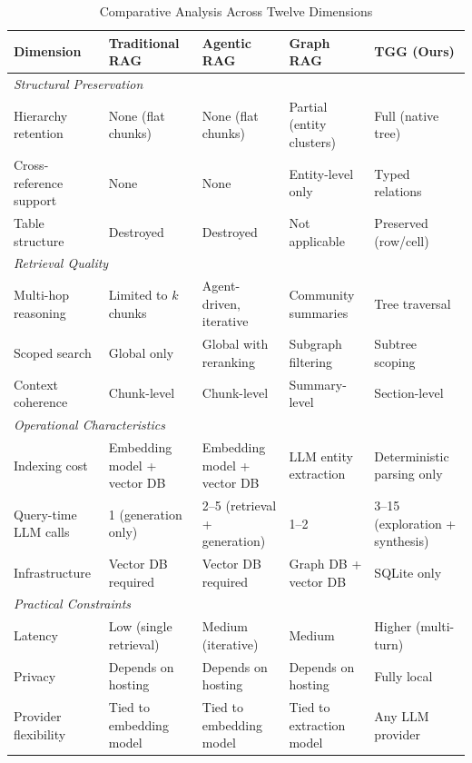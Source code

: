 \documentclass[conference]{IEEEtran}
\begin{document}
\begin{table}[t]
\centering
\caption{Comparative Analysis Across Twelve Dimensions}
\label{tab:comparison}
\footnotesize
\begin{tabular}{@{}p{2.8cm}p{3.2cm}p{3.2cm}p{3.2cm}p{3.2cm}@{}}
\toprule
\textbf{Dimension} & \textbf{Traditional RAG} & \textbf{Agentic RAG} & \textbf{Graph RAG} & \textbf{TGG (Ours)} \\
\midrule
\multicolumn{5}{l}{\textit{Structural Preservation}} \\
\midrule
Hierarchy retention & None (flat chunks) & None (flat chunks) & Partial (entity clusters) & Full (native tree) \\
Cross-reference support & None & None & Entity-level only & Typed relations \\
Table structure & Destroyed & Destroyed & Not applicable & Preserved (row/cell) \\
\midrule
\multicolumn{5}{l}{\textit{Retrieval Quality}} \\
\midrule
Multi-hop reasoning & Limited to $k$ chunks & Agent-driven, iterative & Community summaries & Tree traversal \\
Scoped search & Global only & Global with reranking & Subgraph filtering & Subtree scoping \\
Context coherence & Chunk-level & Chunk-level & Summary-level & Section-level \\
\midrule
\multicolumn{5}{l}{\textit{Operational Characteristics}} \\
\midrule
Indexing cost & Embedding model + vector DB & Embedding model + vector DB & LLM entity extraction & Deterministic parsing only \\
Query-time LLM calls & 1 (generation only) & 2--5 (retrieval + generation) & 1--2 & 3--15 (exploration + synthesis) \\
Infrastructure & Vector DB required & Vector DB required & Graph DB + vector DB & SQLite only \\
\midrule
\multicolumn{5}{l}{\textit{Practical Constraints}} \\
\midrule
Latency & Low (single retrieval) & Medium (iterative) & Medium & Higher (multi-turn) \\
Privacy & Depends on hosting & Depends on hosting & Depends on hosting & Fully local \\
Provider flexibility & Tied to embedding model & Tied to embedding model & Tied to extraction model & Any LLM provider \\
\bottomrule
\end{tabular}
\end{table}
\end{document}
